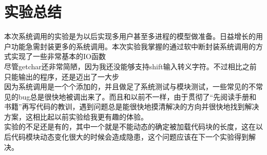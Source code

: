 \documentclass[a4paper,11pt,UTF8]{ctexart}
\newcommand{\bottomcaption}{%
\setlength{\abovecaptionskip}{6pt}%
\setlength{\belowcaptionskip}{6pt}%
\caption}
\begin{document}







\section{实验总结}
	本次系统调用的实验是为以后实现多用户甚至多进程的模型做准备。日益增长的用户功能急需封装更多的系统调用。本次实验我掌握的通过软中断封装系统调用的方式实现了一些非常基本的IO函数\\
	\indent 尽管getchar还非常简陋，因为我还没能够支持shift输入转义字符。不过相比之前只能输出的程序，还是迈出了一大步\\
	\indent 因为系统调用是一个个添加的，并且做足了系统测试与模块测试，一些常见的不常见的bug总是很快地被调出来了。而且和以前不一样，由于贯彻了“先阅读手册和书籍”再写代码的教训，遇到问题总是能很快地摸清解决的方向并很快地找到解决方案，这相比起以前实验给我更有趣的体验。\\
	\indent 实验的不足还是有的，其中一个就是不能动态的确定被加载代码块的长度，这在以后代码模块动态变化很大的时候会造成隐患，这个问题应该在下一个实验得到解决。




\clearpage
\end{document}
